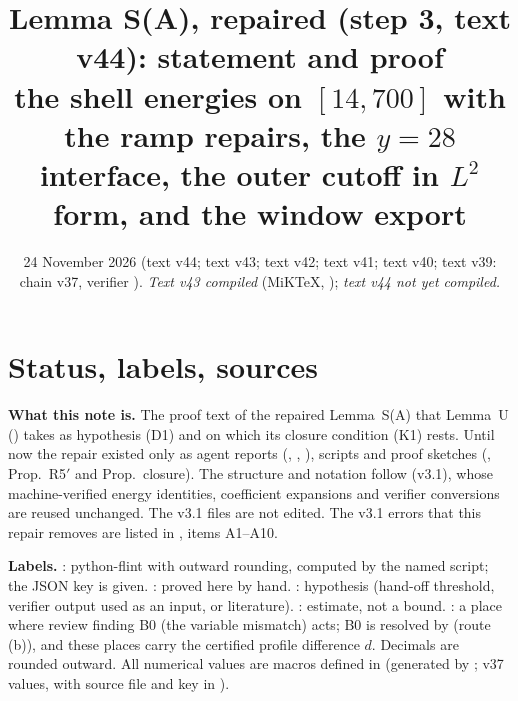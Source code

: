 \documentclass[11pt]{article}
\title{Lemma S(A), repaired (step 3, text v44): statement and proof\\[2pt]\large the shell energies on $[14,700]$ with the ramp repairs, the $y=28$ interface, the outer cutoff in $L^2$ form, and the window export}
\author{}\date{24 November 2026 (text v44; text v43; text v42; text v41; text v40; text v39: chain v37, verifier \fn{fin13v4c}). \emph{Text v43 compiled} (MiKTeX, \fn{fix26_latex_v43/LATEX_v43.md}); \emph{text v44 not yet compiled.}}
\begin{document}
\maketitle
\tableofcontents
\fi

\section{Status, labels, sources}\label{A:sec:status}
\noindent\textbf{What this note is.} The proof text of the repaired Lemma~S(A) that Lemma~U () takes as hypothesis (D1) and on which its closure condition (K1) rests. Until now the repair existed only as agent reports (, , ), scripts and proof sketches (, Prop.~R5$'$ and Prop.~closure). The structure and notation follow  (v3.1), whose machine-verified energy identities, coefficient expansions and verifier conversions are reused unchanged. The v3.1 files are not edited. The v3.1 errors that this repair removes are listed in , items A1--A10.

\noindent\textbf{Labels.} \tC: python-flint  with outward rounding, computed by the named script; the JSON key is given. \tP: proved here by hand. \tH: hypothesis (hand-off threshold, verifier output used as an input, or literature). \tE: estimate, not a bound. \tB: a place where review finding B0 (the variable mismatch) acts; B0 is resolved by  (route (b)), and these places carry the certified profile difference $d$. Decimals are rounded outward. All numerical values are macros defined in  (generated by ; v37 values, with source file and key in ).
\end{document}

